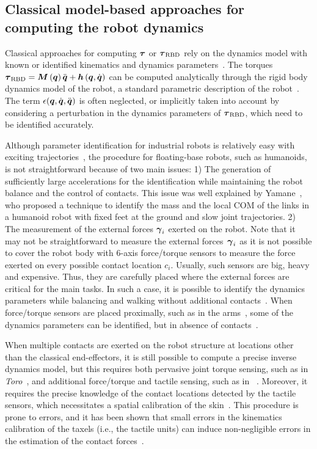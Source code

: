 \subsection{Classical model-based approaches for computing the robot dynamics}

Classical approaches for computing $\boldsymbol{\tau}$ or $\boldsymbol{\tau}_\text{RBD}$ rely on
the dynamics model with known or identified kinematics and dynamics
parameters~\cite{Ivaldi2014}. The torques $\boldsymbol{\tau}_\text{RBD} =
\boldsymbol M \left( \boldsymbol q \right)\ddot{\boldsymbol q} + \boldsymbol{h} \left(\boldsymbol q,\dot{\boldsymbol q} \right)$ can be computed analytically through the rigid
body dynamics model of the robot, a standard parametric description of the
robot~\cite{Featherstone2008}. The term $\epsilon(\boldsymbol q,\dot{\boldsymbol q},\ddot{\boldsymbol q})$ is often
neglected, or implicitly taken into account by considering a perturbation in the
dynamics parameters of $\boldsymbol{\tau}_\text{RBD}$, which need to be identified
accurately.

Although parameter identification for industrial robots is relatively easy with
exciting trajectories~\cite{Pedrocchi2014}, the procedure for floating-base
robots, such as humanoids, is not straightforward because of two main issues: 1)
The generation of sufficiently large accelerations for the identification while
maintaining the robot balance and the control of contacts. This issue was well
explained by Yamane~\cite{Yamane2011calibration}, who proposed a technique to
identify the mass and the local COM of the links in a humanoid robot with fixed
feet at the ground and slow joint trajectories. 2) The measurement of the
external forces $\boldsymbol{\gamma}_i$ exerted on the robot. Note that it may not be
straightforward to measure the external forces~$\boldsymbol{\gamma}_i$ as it is not
possible to cover the robot body with 6-axis force/torque sensors to measure the
force exerted on every possible contact location $c_i$. Usually, such sensors
are big, heavy and expensive. Thus, they are carefully placed where the external
forces are critical for the main tasks. In such a case, it is possible to
identify the dynamics parameters while balancing and walking without additional
contacts~\cite{Ogawa2014}. When force/torque sensors are placed proximally, such
as in the \robot{} arms~\cite{Fumagalli2012}, some of the dynamics parameters
can be identified, but in absence of contacts~\cite{traversaro2013inertial}.

When multiple contacts are exerted on the robot structure at locations other
than the classical end-effectors, it is still possible to compute a precise
inverse dynamics model, but this requires both pervasive joint torque sensing,
such as in \textit{Toro}~\cite{Ogawa2014}, and additional force/torque and
tactile sensing, such as in \robot{}~\cite{Ivaldi2011}. Moreover, it requires
the precise knowledge of the contact locations detected by the tactile sensors,
which necessitates a spatial calibration of the skin~\cite{DelPrete2011}. This
procedure is prone to errors, and it has been shown that small errors in the
kinematics calibration of the taxels (i.e., the tactile units) can induce
non-negligible errors in the estimation of the contact
forces~\cite{DelPrete2012}.

